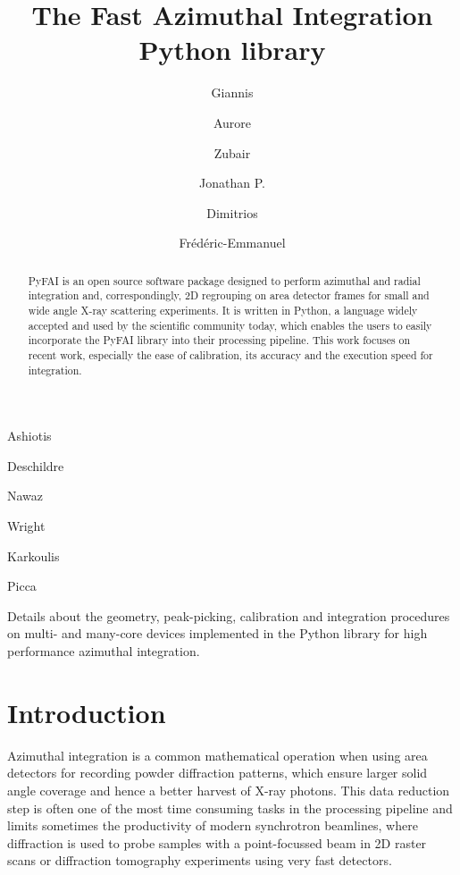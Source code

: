 \documentclass[preprint]{iucr}
\begin{document}
\title{The Fast Azimuthal Integration Python library}

    \author[a]{Giannis}{Ashiotis}
    \author[a]{Aurore}{Deschildre}
    \author[b]{Zubair}{Nawaz}
    \author[a]{Jonathan P.}{Wright}
    \author[a]{Dimitrios}{Karkoulis}
    \author[c]{Fr\'ed\'eric-Emmanuel}{Picca}


\maketitle

\begin{synopsis}
Details about the geometry, peak-picking, calibration and integration procedures
on multi- and many-core devices implemented in the Python library for high
performance azimuthal integration.
\end{synopsis}

\begin{abstract}
PyFAI is an open source software package designed to perform azimuthal and
radial integration and, correspondingly, 2D regrouping on area detector frames for small and wide
angle X-ray scattering experiments.
It is written in Python, a language widely accepted and used by the scientific
community today, which enables the users to easily incorporate the PyFAI
library into their processing pipeline.
This work focuses on recent work, especially the ease of
calibration, its accuracy and the execution speed for integration.
\end{abstract}

\section{Introduction}

Azimuthal integration is a common mathematical operation when using area
detectors for recording powder diffraction patterns, which  ensure larger solid
angle coverage and hence a better harvest of X­-ray photons.
This data reduction step is often one of the most time ­consuming tasks in the
processing pipeline and limits sometimes the productivity of modern synchrotron
beamlines, where diffraction is used to probe samples with a point-focussed
beam in 2D raster scans or diffraction tomography experiments using
very fast detectors.
\end{document}
